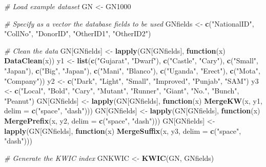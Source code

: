 \documentclass[]{article}
\newenvironment{Shaded}{\begin{snugshade}}{\end{snugshade}}
\newcommand{\CommentTok}[1]{\textcolor[rgb]{0.56,0.35,0.01}{\textit{#1}}}
\newcommand{\ControlFlowTok}[1]{\textcolor[rgb]{0.13,0.29,0.53}{\textbf{#1}}}
\newcommand{\DataTypeTok}[1]{\textcolor[rgb]{0.13,0.29,0.53}{#1}}
\newcommand{\KeywordTok}[1]{\textcolor[rgb]{0.13,0.29,0.53}{\textbf{#1}}}
\newcommand{\NormalTok}[1]{#1}
\newcommand{\StringTok}[1]{\textcolor[rgb]{0.31,0.60,0.02}{#1}}
\begin{document}
\begin{Shaded}
\begin{Highlighting}[]
\CommentTok{# Load example dataset}
\NormalTok{GN <-}\StringTok{ }\NormalTok{GN1000}

\CommentTok{# Specify as a vector the database fields to be used}
\NormalTok{GNfields <-}\StringTok{ }\KeywordTok{c}\NormalTok{(}\StringTok{"NationalID"}\NormalTok{, }\StringTok{"CollNo"}\NormalTok{, }\StringTok{"DonorID"}\NormalTok{, }\StringTok{"OtherID1"}\NormalTok{, }\StringTok{"OtherID2"}\NormalTok{)}

\CommentTok{# Clean the data}
\NormalTok{GN[GNfields] <-}\StringTok{ }\KeywordTok{lapply}\NormalTok{(GN[GNfields], }\ControlFlowTok{function}\NormalTok{(x) }\KeywordTok{DataClean}\NormalTok{(x))}
\NormalTok{y1 <-}\StringTok{ }\KeywordTok{list}\NormalTok{(}\KeywordTok{c}\NormalTok{(}\StringTok{"Gujarat"}\NormalTok{, }\StringTok{"Dwarf"}\NormalTok{), }\KeywordTok{c}\NormalTok{(}\StringTok{"Castle"}\NormalTok{, }\StringTok{"Cary"}\NormalTok{), }\KeywordTok{c}\NormalTok{(}\StringTok{"Small"}\NormalTok{, }\StringTok{"Japan"}\NormalTok{),}
\KeywordTok{c}\NormalTok{(}\StringTok{"Big"}\NormalTok{, }\StringTok{"Japan"}\NormalTok{), }\KeywordTok{c}\NormalTok{(}\StringTok{"Mani"}\NormalTok{, }\StringTok{"Blanco"}\NormalTok{), }\KeywordTok{c}\NormalTok{(}\StringTok{"Uganda"}\NormalTok{, }\StringTok{"Erect"}\NormalTok{),}
\KeywordTok{c}\NormalTok{(}\StringTok{"Mota"}\NormalTok{, }\StringTok{"Company"}\NormalTok{))}
\NormalTok{y2 <-}\StringTok{ }\KeywordTok{c}\NormalTok{(}\StringTok{"Dark"}\NormalTok{, }\StringTok{"Light"}\NormalTok{, }\StringTok{"Small"}\NormalTok{, }\StringTok{"Improved"}\NormalTok{, }\StringTok{"Punjab"}\NormalTok{, }\StringTok{"SAM"}\NormalTok{)}
\NormalTok{y3 <-}\StringTok{ }\KeywordTok{c}\NormalTok{(}\StringTok{"Local"}\NormalTok{, }\StringTok{"Bold"}\NormalTok{, }\StringTok{"Cary"}\NormalTok{, }\StringTok{"Mutant"}\NormalTok{, }\StringTok{"Runner"}\NormalTok{, }\StringTok{"Giant"}\NormalTok{, }\StringTok{"No."}\NormalTok{,}
        \StringTok{"Bunch"}\NormalTok{, }\StringTok{"Peanut"}\NormalTok{)}
\NormalTok{GN[GNfields] <-}\StringTok{ }\KeywordTok{lapply}\NormalTok{(GN[GNfields],}
                       \ControlFlowTok{function}\NormalTok{(x) }\KeywordTok{MergeKW}\NormalTok{(x, y1, }\DataTypeTok{delim =} \KeywordTok{c}\NormalTok{(}\StringTok{"space"}\NormalTok{, }\StringTok{"dash"}\NormalTok{)))}
\NormalTok{GN[GNfields] <-}\StringTok{ }\KeywordTok{lapply}\NormalTok{(GN[GNfields],}
                       \ControlFlowTok{function}\NormalTok{(x) }\KeywordTok{MergePrefix}\NormalTok{(x, y2, }\DataTypeTok{delim =} \KeywordTok{c}\NormalTok{(}\StringTok{"space"}\NormalTok{, }\StringTok{"dash"}\NormalTok{)))}
\NormalTok{GN[GNfields] <-}\StringTok{ }\KeywordTok{lapply}\NormalTok{(GN[GNfields],}
                       \ControlFlowTok{function}\NormalTok{(x) }\KeywordTok{MergeSuffix}\NormalTok{(x, y3, }\DataTypeTok{delim =} \KeywordTok{c}\NormalTok{(}\StringTok{"space"}\NormalTok{, }\StringTok{"dash"}\NormalTok{)))}

\CommentTok{# Generate the KWIC index}
\NormalTok{GNKWIC <-}\StringTok{ }\KeywordTok{KWIC}\NormalTok{(GN, GNfields)}
\end{Highlighting}
\end{Shaded}
\end{document}
